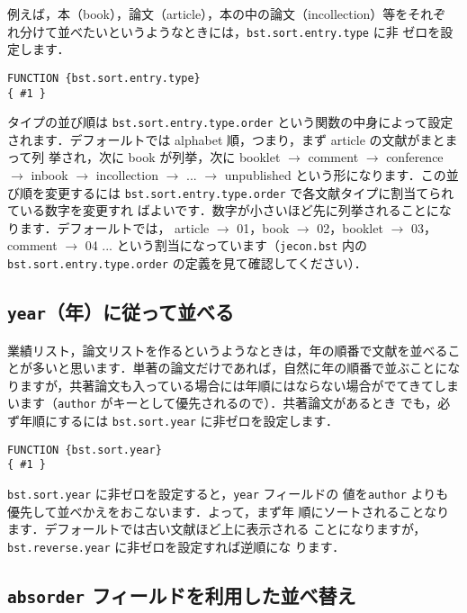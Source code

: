 \documentclass[a4j,10pt]{jarticle}
\begin{document}
例えば，本（book），論文（article），本の中の論文（incollection）等をそれぞ
れ分けて並べたいというようなときには，\texttt{bst.sort.entry.type} に非
ゼロを設定します．
\begin{screen}
\begin{verbatim}
FUNCTION {bst.sort.entry.type}
{ #1 }
\end{verbatim}
\end{screen}

タイプの並び順は \texttt{bst.sort.entry.type.order} という関数の中身によって設定
されます．デフォールトでは alphabet 順，つまり，まず article の文献がまとまって列
挙され，次に book が列挙，次に booklet $\rightarrow$ comment $\rightarrow$
conference $\rightarrow$ inbook $\rightarrow$ incollection $\rightarrow$
... $\rightarrow$ unpublished という形になります．この並び順を変更するには
\texttt{bst.sort.entry.type.order} で各文献タイプに割当てられている数字を変更すれ
ばよいです．数字が小さいほど先に列挙されることになります．デフォールトでは，
article $\rightarrow$ 01，book $\rightarrow$ 02，booklet $\rightarrow$ 03，
comment $\rightarrow$ 04 ... という割当になっています（\texttt{jecon.bst} 内の
\texttt{bst.sort.entry.type.order} の定義を見て確認してください）．

\subsection{\texttt{year}（年）に従って並べる}

業績リスト，論文リストを作るというようなときは，年の順番で文献を並べるこ
とが多いと思います．単著の論文だけであれば，自然に年の順番で並ぶことにな
りますが，共著論文も入っている場合には年順にはならない場合がでてきてしま
います（\texttt{author} がキーとして優先されるので）．共著論文があるとき
でも，必ず年順にするには \texttt{bst.sort.year} に非ゼロを設定します．
\begin{screen}
\begin{verbatim}
FUNCTION {bst.sort.year}
{ #1 }
\end{verbatim}
\end{screen}
\texttt{bst.sort.year} に非ゼロを設定すると，\texttt{year} フィールドの
値を\texttt{author} よりも優先して並べかえをおこないます．よって，まず年
順にソートされることなります．デフォールトでは古い文献ほど上に表示される
ことになりますが，\texttt{bst.reverse.year} に非ゼロを設定すれば逆順にな
ります．


\subsection{\texttt{absorder} フィールドを利用した並べ替え}
\end{document}
